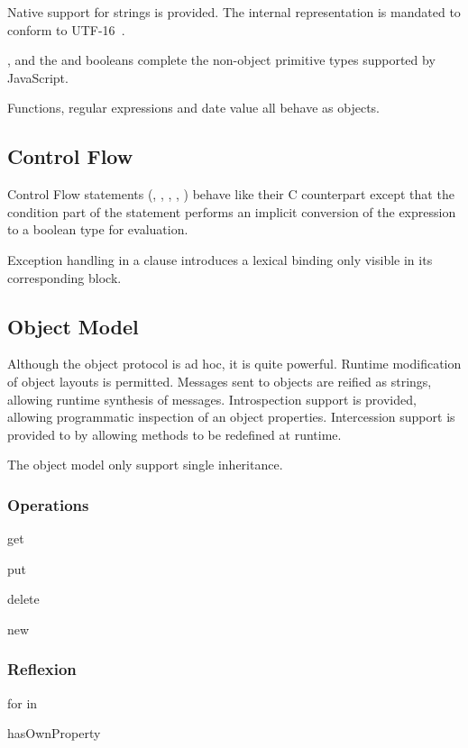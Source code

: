 Native support for strings is provided. The internal representation is mandated to conform to UTF-16~\cite{rfc2781}.

,  and the  and  booleans complete the non-object primitive types supported by JavaScript.

Functions, regular expressions and date value all behave as objects.

\subsection{Control Flow}

Control Flow statements (, , , , ) behave like their C counterpart except that the condition part of the statement performs an implicit conversion of the expression to a boolean type for evaluation.

Exception handling in a  clause introduces a lexical binding only visible in its corresponding block.

\subsection{Object Model}

Although the object protocol is ad hoc, it is quite powerful. Runtime modification of object layouts is permitted. Messages sent to objects are reified as strings, allowing runtime synthesis of messages. Introspection support is provided, allowing programmatic inspection of an object properties. Intercession support is provided to by allowing methods to be redefined at runtime.

The object model only support single inheritance.

\subsubsection{Operations}

get

put

delete

new


\subsubsection{Reflexion}

for in 

hasOwnProperty

